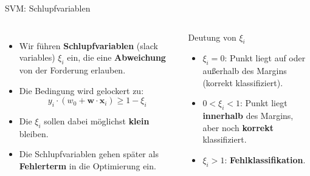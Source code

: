 \begin{frame}{SVM: Schlupfvariablen}
\begin{columns}
\begin{itemize}
  \item Wir führen \textbf{Schlupfvariablen} (slack variables) $\xi_i$ ein,
        die eine \textbf{Abweichung} von der Forderung erlauben.
  \item Die Bedingung wird gelockert zu:
        \[
          y_i \cdot (w_0 + \mathbf{w}\cdot\mathbf{x}_i) \geq 1 - \xi_i
        \]
  \item Die $\xi_i$ sollen dabei möglichst \textbf{klein} bleiben.
  \item Die Schlupfvariablen gehen später als \textbf{Fehlerterm} in die
        Optimierung ein.
\end{itemize}

\begin{blockC1}{Deutung von $\xi_i$}
\begin{itemize}
  \item $\xi_i = 0$: Punkt liegt auf oder außerhalb des Margins (korrekt
        klassifiziert).
  \item $0 < \xi_i < 1$: Punkt liegt \textbf{innerhalb} des Margins, aber
        noch \textbf{korrekt} klassifiziert.
  \item $\xi_i > 1$: \textbf{Fehlklassifikation}.
\end{itemize}
\end{blockC1}
\end{columns}
\end{frame}

